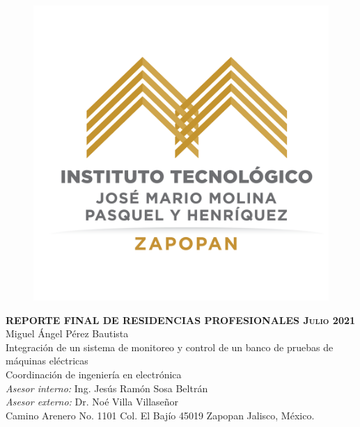\documentclass[12pt,titlepage]{article}
\begin{document}
\setlength{\parindent}{1.1cm} %
\setcounter{tocdepth}{4}
\setcounter{secnumdepth}{4}
\renewcommand{\labelitemi}{$\cdot$} %

\begin{titlepage} %

\begin{center} %
\begin{figure}[htbp]
\hspace*{1.8cm} 
\includegraphics[scale=0.39]{Tec_logo}
\end{figure}

 \hspace{17mm}\textbf{\textsc{REPORTE FINAL DE RESIDENCIAS PROFESIONALES \newline
 Julio 2021}}\\[10mm]
  Miguel Ángel Pérez Bautista \\[4.5mm]
 Integración de un sistema de monitoreo y control de un banco de pruebas de máquinas eléctricas\\[4.5mm]
 Coordinación de ingeniería en electrónica\\[4.5mm]
 \vspace{5mm}
\textsl{Asesor interno: }     Ing. Jesús Ramón Sosa Beltrán\\[5mm]
\textsl{Asesor externo: } Dr. Noé Villa Villaseñor\\[5mm]
 \vspace{8mm}
\hspace*{1.0cm} Camino Arenero No. 1101 Col. El Bajío 45019 Zapopan Jalisco, México.
\end{center}
\end{titlepage} %
\newpage %
\end{document}
